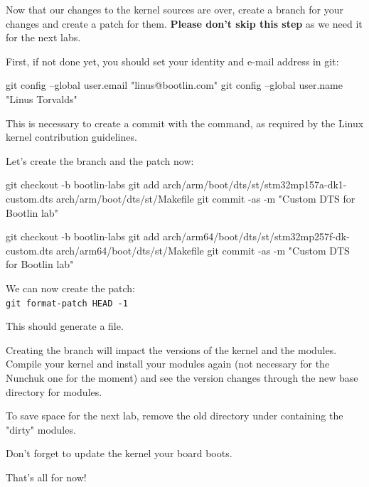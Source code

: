 Now that our changes to the kernel sources are over,
create a branch for your changes and create a patch for them.
{\bf Please don't skip this step} as we need it for the next labs.

First, if not done yet, you should set your identity
and e-mail address in git:

\begin{bashinput}
git config --global user.email "linus@bootlin.com"
git config --global user.name "Linus Torvalds"
\end{bashinput}

This is necessary to create a commit with the 
command, as required by the Linux kernel contribution guidelines.

Let's create the branch and the patch now:

\if{}
\begin{bashinput}
git checkout -b bootlin-labs
git add arch/arm/boot/dts/st/stm32mp157a-dk1-custom.dts arch/arm/boot/dts/st/Makefile
git commit -as -m "Custom DTS for Bootlin lab"
\end{bashinput}
\fi
\if{}
\begin{bashinput}
git checkout -b bootlin-labs
git add arch/arm64/boot/dts/st/stm32mp257f-dk-custom.dts arch/arm64/boot/dts/st/Makefile
git commit -as -m "Custom DTS for Bootlin lab"
\end{bashinput}
\fi

We can now create the patch:\\
\texttt{git format-patch HEAD -1}

This should generate a 
file.

Creating the branch will impact the versions of the kernel and the modules.
Compile your kernel and install your modules again (not necessary for the
Nunchuk one for the moment) and see the version changes through the
new base directory for modules.

To save space for the next lab, remove the old directory under
 containing the "dirty" modules.

Don't forget to update the kernel your board boots.

That's all for now!
